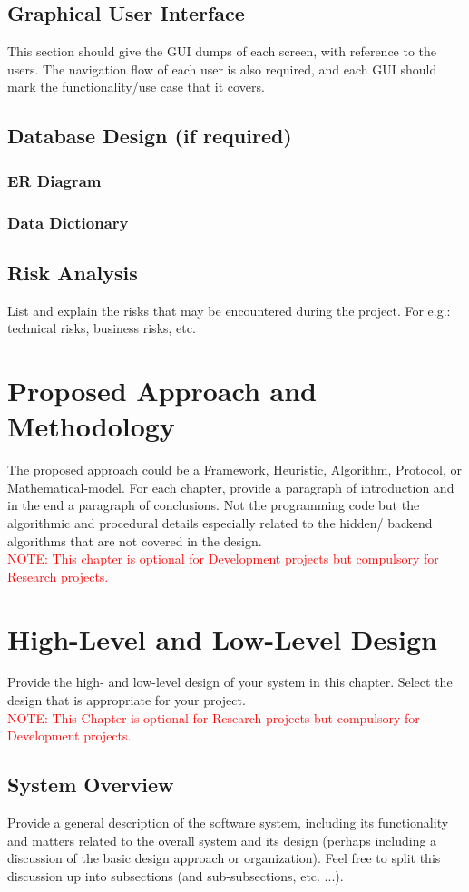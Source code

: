 \documentclass{FastFyp}
\begin{document}
\section{Graphical User Interface}
This section should give the GUI dumps of each screen, with reference to the users. The navigation flow of each user is also required, and each GUI should mark the functionality/use case that it covers.
\section{Database Design (if required)}
\subsection{ER Diagram}
\subsection{Data Dictionary}
\section{ Risk Analysis}
List and explain the risks that may be encountered during the project. For e.g.: technical risks, business risks, etc.
\chapter{Proposed Approach and Methodology}
The proposed approach could be a Framework, Heuristic, Algorithm, Protocol, or Mathematical-model.
For each chapter, provide a paragraph of introduction and in the end a paragraph of conclusions. Not the programming code but the algorithmic and procedural details especially related to the hidden/ backend algorithms that are not covered in the design.\\
\textcolor{red}{NOTE: This chapter is optional for Development projects but compulsory for Research projects.} 
\chapter{High-Level and Low-Level Design}
Provide the high- and low-level design of your system in this chapter. Select the design that is appropriate for your project.\\
\textcolor{red}{NOTE: This Chapter is optional for Research projects but compulsory for Development projects.}
\section{System Overview}
Provide a general description of the software system, including its functionality and matters related to the overall system and its design (perhaps including a discussion of the basic design approach or organization). Feel free to split this discussion up into subsections (and sub-subsections, etc. ...).
\end{document}

